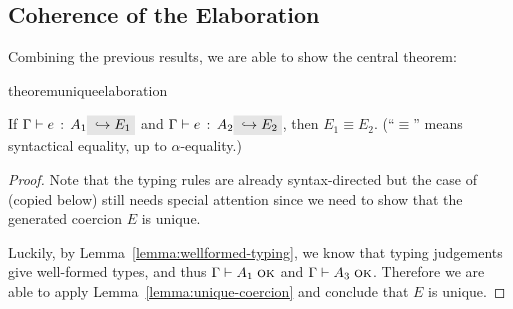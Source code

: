 
\subsection{Coherence of the Elaboration}
Combining the previous results, we are able to show the central theorem:

\begin{restatable}{theorem}{uniqueelaboration}
  \label{theorem:unique-elaboration}

  If $\jtype \Gamma e {A_1} \yields {E_1}$ and $\jtype \Gamma e {A_2} \yields
  {E_2}$, then $E_1 \equiv E_2$. (``$\equiv$'' means syntactical equality, up to
  $\alpha$-equality.)

\end{restatable}

\begin{proof}
  Note that the typing rules are already syntax-directed but the case of
   (copied below) still needs special attention since we
  need to show that the generated coercion $E$ is unique.
  \begin{mathpar}
  \end{mathpar}
  Luckily, by Lemma~\ref{lemma:wellformed-typing}, we know that typing
  judgements give well-formed types, and thus $\jwf \Gamma {A_1}$ and $\jwf
  \Gamma {A_3}$. Therefore we are able to apply
  Lemma~\ref{lemma:unique-coercion} and conclude that $E$ is unique.

\end{proof}
